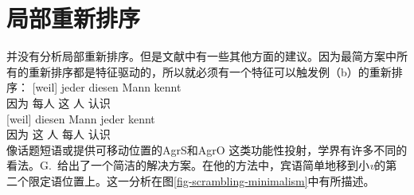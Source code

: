 \section{局部重新排序}

\citet{Adger2003a} 并没有分析局部重新排序。但是文献中有一些其他方面的建议。因为最简方案中所有的重新排序都是特征驱动的，所以就必须有一个特征可以触发例（b）的重新排序：
\eal
\ex 
\gll {}[weil] jeder diesen Mann kennt\\
	 {}\spacebr{}因为 每人 这 人 认识\\
\ex 
\gll {}[weil] diesen Mann jeder kennt\\
	 {}\spacebr{}因为 这 人 每人 认识\\
\zl
像话题短语\citep[]{Laenzlinger2004a}或提供可移动位置的AgrS和AgrO \citep[第4章]{Meinunger2000a}这类功能性投射，学界有许多不同的看法。G.\  \citet[3.5]{GMueller2014a-u}给出了一个简洁的解决方案。在他的方法中，宾语简单地移到小\emph{v}的第二个限定语位置上。这一分析在图\vref{fig-scrambling-minimalism}中有所描述。 


